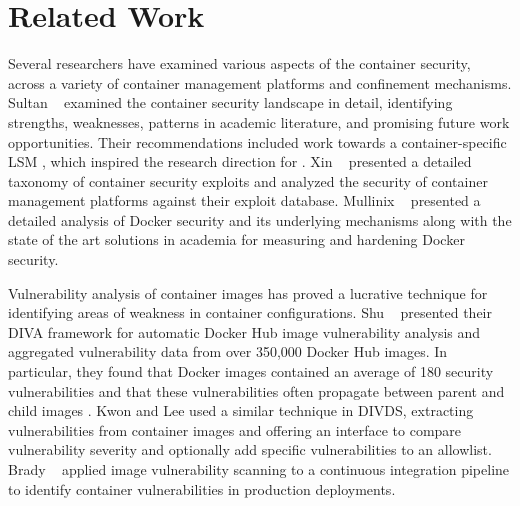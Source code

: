 \section{Related Work}

Several researchers \cite{sultan2019_container_security,xin2018_container_security,mullinix2020_security_measures} have examined various aspects of the container security, across a variety of container management platforms and confinement mechanisms. Sultan \etal~\cite{sultan2019_container_security} examined the container security landscape in detail, identifying strengths, weaknesses, patterns in academic literature,  and promising future work opportunities. Their recommendations included work towards a container-specific LSM \cite{sultan2019_container_security}, which inspired the research direction for \bpfcontain{}. Xin \etal~\cite{xin2018_container_security} presented a detailed taxonomy of container security exploits and analyzed the security of container management platforms against their exploit database. Mullinix \etal~\cite{mullinix2020_security_measures} presented a detailed analysis of Docker security and its underlying mechanisms along with the state of the art solutions in academia for measuring and hardening Docker security.

Vulnerability analysis of container images \cite{shu2017_image_vuln,kwon2020_divds,brady2020_docker_cloud} has proved a lucrative technique for identifying areas of weakness in container configurations. Shu \etal~\cite{shu2017_image_vuln} presented their DIVA framework for automatic Docker Hub image vulnerability analysis and aggregated vulnerability data from over 350,000 Docker Hub images. In particular, they found that Docker images contained an average of 180 security vulnerabilities and that these vulnerabilities often propagate between parent and child images \cite{shu2017_image_vuln}. Kwon and Lee \cite{kwon2020_divds} used a similar technique in DIVDS, extracting vulnerabilities from container images and offering an interface to compare vulnerability severity and optionally add specific vulnerabilities to an allowlist. Brady \etal~\cite{brady2020_docker_cloud} applied image vulnerability scanning to a continuous integration pipeline to identify container vulnerabilities in production deployments.


